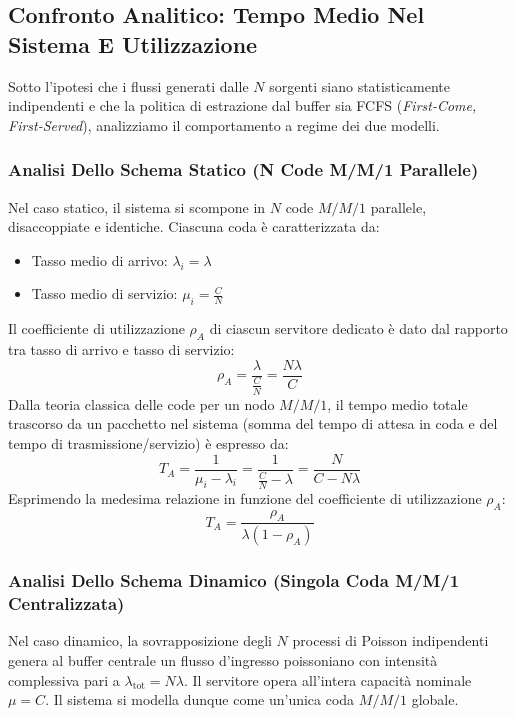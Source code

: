 \documentclass[11pt, a4paper]{article}
\begin{document}
\subsection{Confronto Analitico: Tempo Medio Nel Sistema E Utilizzazione}

Sotto l'ipotesi che i flussi generati dalle $N$ sorgenti siano statisticamente indipendenti e che la politica di estrazione dal buffer sia FCFS (\emph{First-Come, First-Served}), analizziamo il comportamento a regime dei due modelli.


\subsubsection{Analisi Dello Schema Statico (N Code M/M/1 Parallele)}

Nel caso statico, il sistema si scompone in $N$ code $M/M/1$ parallele, disaccoppiate e identiche. Ciascuna coda è caratterizzata da:
\begin{itemize}[noitemsep]
    \item Tasso medio di arrivo: $\lambda_i = \lambda$
    \item Tasso medio di servizio: $\mu_i = \frac{C}{N}$
\end{itemize}
Il coefficiente di utilizzazione $\rho_A$ di ciascun servitore dedicato è dato dal rapporto tra tasso di arrivo e tasso di servizio:
\[
\rho_A = \frac{\lambda}{\displaystyle\frac{C}{N}} = \frac{N \lambda}{C}
\]
Dalla teoria classica delle code per un nodo $M/M/1$, il tempo medio totale trascorso da un pacchetto nel sistema (somma del tempo di attesa in coda e del tempo di trasmissione/servizio) è espresso da:
\[
T_A = \frac{1}{\mu_i - \lambda_i} = \frac{1}{\displaystyle\frac{C}{N} - \lambda} = \frac{N}{C - N\lambda}
\]
Esprimendo la medesima relazione in funzione del coefficiente di utilizzazione $\rho_A$:
\[
T_A = \frac{\rho_A}{\lambda (1 - \rho_A)}
\]

\subsubsection{Analisi Dello Schema Dinamico (Singola Coda M/M/1 Centralizzata)}

Nel caso dinamico, la sovrapposizione degli $N$ processi di Poisson indipendenti genera al buffer centrale un flusso d'ingresso poissoniano con intensità complessiva pari a $\lambda_{\text{tot}} = N \lambda$. Il servitore opera all'intera capacità nominale $\mu = C$. Il sistema si modella dunque come un'unica coda $M/M/1$ globale.
\end{document}

